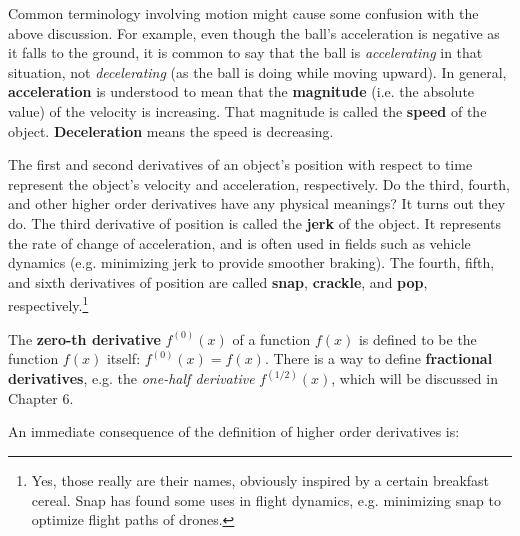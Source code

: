 Common terminology involving motion might cause some confusion with the above
discussion. For example, even though the ball's acceleration is negative as it
falls to the ground, it is common to say that the ball is \emph{accelerating} in
that situation, not \emph{decelerating} (as the ball is doing while moving
upward).
In general, \textbf{acceleration} is understood to mean that the
\textbf{magnitude} (i.e. the absolute value) of the velocity is increasing. That
magnitude is called the \textbf{speed} of the object. \textbf{Deceleration} means
the speed is decreasing.

The first and second derivatives of an object's position with respect to time
represent the object's velocity and acceleration, respectively. Do the
third, fourth, and other higher order derivatives have any physical meanings?
It turns out they do. The third derivative of position is called
the \textbf{jerk} of the object. It represents the rate of change
of acceleration, and is often used in fields such as vehicle dynamics (e.g.
minimizing jerk to provide smoother braking). The fourth, fifth, and sixth
derivatives of position are called \textbf{snap}, \textbf{crackle}, and
\textbf{pop}, respectively.\footnote{Yes, those really are their names,
obviously inspired by a certain breakfast cereal. Snap has found some uses in
flight dynamics, e.g. minimizing snap to optimize flight paths of drones.}

The \textbf{zero-th derivative} $f^{(0)}(x)$ of a
function $f(x)$ is defined to be the function $f(x)$ itself:
$f^{(0)}(x) = f(x)$. There is a way to define \textbf{fractional derivatives},
e.g. the \emph{one-half derivative} $f^{(1/2)}(x)$, which will be discussed
in Chapter 6.

An immediate consequence of the definition of higher order derivatives is:

